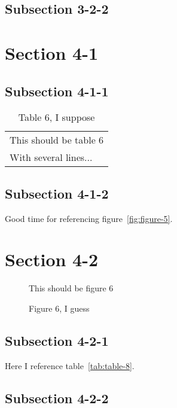 \documentclass[10pt]{article}
\begin{document}
\subsection{Subsection 3-2-2}
\label{sec:subsection-3-2-2}


\section{Section 4-1}
\label{sec:section-4-1}
\secttoc
\sectlot
\sectlof


\subsection{Subsection 4-1-1}
\label{sec:subsection-4-1-1}

\begin{table}
  \centering
  \begin{tabular}{l}
    This should be table 6\\
    With several lines...
  \end{tabular}
  \caption{Table 6, I suppose}
  \label{tab:table-6}
\end{table}


\subsection{Subsection 4-1-2}
\label{sec:subsection-4-1-2}

Good time for referencing figure~\ref{fig:figure-5}.

\section{Section 4-2}
\label{sec:section-4-2}
\secttoc
\sectlot
\sectlof

\begin{figure}
  \centering
  This should be figure 6
  \caption{Figure 6, I guess}
  \label{fig:figure-6}
\end{figure}



\subsection{Subsection 4-2-1}
\label{sec:subsection-4-2-1}

Here I reference table~\ref{tab:table-8}.

\subsection{Subsection 4-2-2}
\label{sec:subsection-4-2-2}
\end{document}
